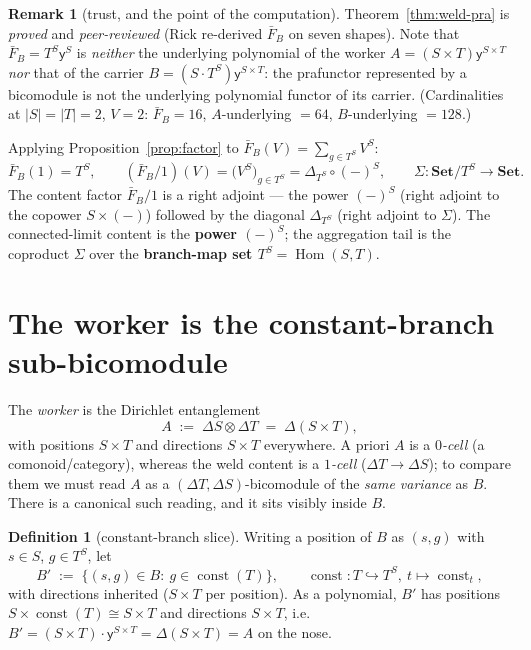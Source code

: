 \documentclass[11pt]{amsart}
\theoremstyle{plain}
\theoremstyle{definition}
\newtheorem{definition}[theorem]{Definition}
\newtheorem{remark}[theorem]{Remark}
\newcommand{\Set}{\mathbf{Set}}
\newcommand{\Store}[1]{\Delta #1}
\newcommand{\yon}{\mathsf{y}}
\DeclareMathOperator{\const}{const}
\DeclareMathOperator{\Hom}{Hom}
\begin{document}
\begin{remark}[trust, and the point of the computation]\label{rem:trust-pra}
Theorem~\ref{thm:weld-pra} is \emph{proved} and \emph{peer-reviewed} (Rick re-derived
$\bar F_B$ on seven shapes). Note that $\bar F_B=T^{S}\yon^{S}$ is \emph{neither} the
underlying polynomial of the worker $A=(S\times T)\yon^{S\times T}$ \emph{nor} that of the
carrier $B=(S\cdot T^{S})\yon^{S\times T}$: the prafunctor represented by a bicomodule is not
the underlying polynomial functor of its carrier. (Cardinalities at $|S|=|T|=2$, $V=2$:
$\bar F_B=16$, $A$-underlying $=64$, $B$-underlying $=128$.)
\end{remark}

Applying Proposition~\ref{prop:factor} to $\bar F_B(V)=\sum_{g\in T^{S}}V^{S}$:
\[
\bar F_B(1)=T^{S},\qquad
(\bar F_B/1)(V)=\bigl(V^{S}\bigr)_{g\in T^{S}}=\Delta_{T^{S}}\circ(-)^{S},\qquad
\Sigma\colon \Set/T^{S}\to\Set.
\]
The content factor $\bar F_B/1$ is a right adjoint --- the power $(-)^{S}$ (right adjoint to
the copower $S\times(-)$) followed by the diagonal $\Delta_{T^{S}}$ (right adjoint to
$\Sigma$). The connected-limit content is the \textbf{power $(-)^{S}$}; the aggregation tail
is the coproduct $\Sigma$ over the \textbf{branch-map set $T^{S}=\Hom(S,T)$}.

\section{The worker is the constant-branch sub-bicomodule}\label{sec:worker}

The \emph{worker} is the Dirichlet entanglement
\[
A\;:=\;\Store{S}\otimes\Store{T}\;=\;\Store{(S\times T)},
\]
with positions $S\times T$ and directions $S\times T$ everywhere. A priori $A$ is a
\emph{$0$-cell} (a comonoid/category), whereas the weld content is a \emph{$1$-cell}
($\Store{T}\to\Store{S}$); to compare them we must read $A$ as a
$(\Store{T},\Store{S})$-bicomodule of the \emph{same variance} as $B$. There is a canonical
such reading, and it sits visibly inside $B$.

\begin{definition}[constant-branch slice]\label{def:Bprime}
Writing a position of $B$ as $(s,g)$ with $s\in S$, $g\in T^{S}$, let
\[
B'\;:=\;\{(s,g)\in B:\ g\in\const(T)\}, \qquad \const\colon T\hookrightarrow T^{S},\ t\mapsto\const_t,
\]
with directions inherited ($S\times T$ per position). As a polynomial, $B'$ has positions
$S\times\const(T)\cong S\times T$ and directions $S\times T$, i.e.\
$B'=(S\times T)\cdot\yon^{S\times T}=\Store{(S\times T)}=A$ on the nose.
\end{definition}
\end{document}
